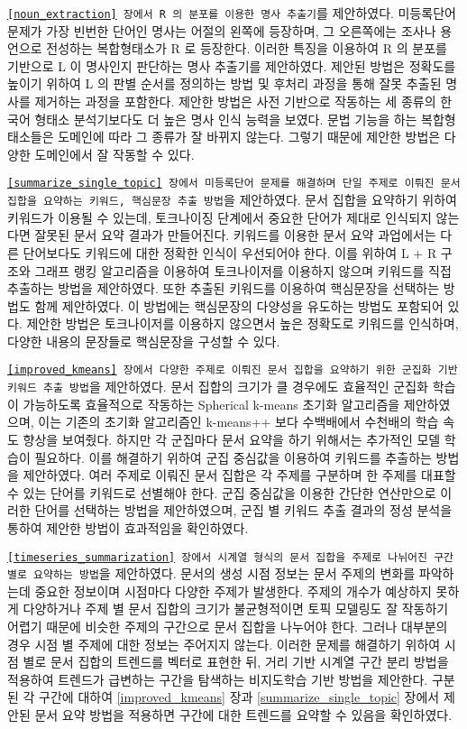 \documentclass[oneside, ko,phd]{snuthesis_utf8_kor}
\begin{document}
\texttt{\ref{noun_extraction} 장에서 R 의 분포를 이용한 명사 추출기}를 제안하였다.
미등록단어 문제가 가장 빈번한 단어인 명사는 어절의 왼쪽에 등장하며, 그 오른쪽에는 조사나 용언으로 전성하는 복합형태소가 R 로 등장한다.
이러한 특징을 이용하여 R 의 분포를 기반으로 L 이 명사인지 판단하는 명사 추출기를 제안하였다.
제안된 방법은 정확도를 높이기 위하여 L 의 판별 순서를 정의하는 방법 및 후처리 과정을 통해 잘못 추출된 명사를 제거하는 과정을 포함한다.
제안한 방법은 사전 기반으로 작동하는 세 종류의 한국어 형태소 분석기보다도 더 높은 명사 인식 능력을 보였다.
문법 기능을 하는 복합형태소들은 도메인에 따라 그 종류가 잘 바뀌지 않는다.
그렇기 때문에 제안한 방법은 다양한 도메인에서 잘 작동할 수 있다.
  
\texttt{\ref{summarize_single_topic} 장에서 미등록단어 문제를 해결하며 단일 주제로 이뤄진 문서 집합을 요약하는 키워드, 핵심문장 추출 방법}을 제안하였다.
문서 집합을 요약하기 위하여 키워드가 이용될 수 있는데, 토크나이징 단계에서 중요한 단어가 제대로 인식되지 않는다면 잘못된 문서 요약 결과가 만들어진다.
키워드를 이용한 문서 요약 과업에서는 다른 단어보다도 키워드에 대한 정확한 인식이 우선되어야 한다.
이를 위하여 L + R 구조와 그래프 랭킹 알고리즘을 이용하여 토크나이저를 이용하지 않으며 키워드를 직접 추출하는 방법을 제안하였다.
또한 추출된 키워드를 이용하여 핵심문장을 선택하는 방법도 함께 제안하였다.
이 방법에는 핵심문장의 다양성을 유도하는 방법도 포함되어 있다.
제안한 방법은 토크나이저를 이용하지 않으면서 높은 정확도로 키워드를 인식하며, 다양한 내용의 문장들로 핵심문장을 구성할 수 있다.

\texttt{\ref{improved_kmeans} 장에서 다양한 주제로 이뤄진 문서 집합을 요약하기 위한 군집화 기반 키워드 추출 방법}을 제안하였다.
문서 집합의 크기가 클 경우에도 효율적인 군집화 학습이 가능하도록 효율적으로 작동하는 Spherical k-means 초기화 알고리즘을 제안하였으며, 이는 기존의 초기화 알고리즘인 k-means++ 보다 수백배에서 수천배의 학습 속도 향상을 보여줬다.
하지만 각 군집마다 문서 요약을 하기 위해서는 추가적인 모델 학습이 필요하다.
이를 해결하기 위하여 군집 중심값을 이용하여 키워드를 추출하는 방법을 제안하였다.
여러 주제로 이뤄진 문서 집합은 각 주제를 구분하며 한 주제를 대표할 수 있는 단어를 키워드로 선별해야 한다.
군집 중심값을 이용한 간단한 연산만으로 이러한 단어를 선택하는 방법을 제안하였으며, 군집 별 키워드 추출 결과의 정성 분석을 통하여 제안한 방법이 효과적임을 확인하였다.

\texttt{\ref{timeseries_summarization} 장에서 시계열 형식의 문서 집합을 주제로 나뉘어진 구간 별로 요약하는 방법}을 제안하였다.
문서의 생성 시점 정보는 문서 주제의 변화를 파악하는데 중요한 정보이며 시점마다 다양한 주제가 발생한다.
주제의 개수가 예상하지 못하게 다양하거나 주제 별 문서 집합의 크기가 불균형적이면 토픽 모델링도 잘 작동하기 어렵기 때문에 비슷한 주제의 구간으로 문서 집합을 나누어야 한다.
그러나 대부분의 경우 시점 별 주제에 대한 정보는 주어지지 않는다.
이러한 문제를 해결하기 위하여 시점 별로 문서 집합의 트렌드를 벡터로 표현한 뒤, 거리 기반 시계열 구간 분리 방법을 적용하여 트렌드가 급변하는 구간을 탐색하는 비지도학습 기반 방법을 제안한다.
구분된 각 구간에 대하여 \ref{improved_kmeans} 장과 \ref{summarize_single_topic} 장에서 제안된 문서 요약 방법을 적용하면 구간에 대한 트렌드를 요약할 수 있음을 확인하였다.
\end{document}
